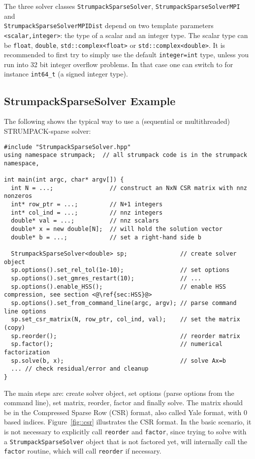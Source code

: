 \documentclass{article}
\begin{document}
The three solver classes \lstinline[style=C]!StrumpackSparseSolver!,
\lstinline[style=C]!StrumpackSparseSolverMPI! and\\
\lstinline[style=C]!StrumpackSparseSolverMPIDist! depend on two
template parameters \lstinline[style=C]!<scalar,integer>!: the type of
a scalar and an integer type. The scalar type can be
\lstinline[style=C]!float!, \lstinline[style=C]!double!,
\lstinline[style=C]!std::complex<float>! or
\lstinline[style=C]!std::complex<double>!. It is recommended to first
try to simply use the default \lstinline[style=C]!integer=int! type,
unless you run into 32 bit integer overflow problems. In that case one
can switch to for instance \lstinline[style=C]!int64_t! (a signed
integer type).

\subsection{StrumpackSparseSolver Example}
The following shows the typical way to use a (sequential or
multithreaded) STRUMPACK-sparse solver:
\begin{lstlisting}[style=C]
#include "StrumpackSparseSolver.hpp"
using namespace strumpack;  // all strumpack code is in the strumpack namespace,

int main(int argc, char* argv[]) {
  int N = ...;                // construct an NxN CSR matrix with nnz nonzeros
  int* row_ptr = ...;         // N+1 integers
  int* col_ind = ...;         // nnz integers
  double* val = ...;          // nnz scalars
  double* x = new double[N];  // will hold the solution vector
  double* b = ...;            // set a right-hand side b

  StrumpackSparseSolver<double> sp;               // create solver object
  sp.options().set_rel_tol(1e-10);                // set options
  sp.options().set_gmres_restart(10);             // ...
  sp.options().enable_HSS();                      // enable HSS compression, see section <@\ref{sec:HSS}@>
  sp.options().set_from_command_line(argc, argv); // parse command line options
  sp.set_csr_matrix(N, row_ptr, col_ind, val);    // set the matrix (copy)
  sp.reorder();                                   // reorder matrix
  sp.factor();                                    // numerical factorization
  sp.solve(b, x);                                 // solve Ax=b
  ... // check residual/error and cleanup
}
\end{lstlisting}
The main steps are: create solver object, set options (parse options
from the command line), set matrix, reorder, factor and finally
solve. The matrix should be in the Compressed Sparse Row (CSR) format,
also called Yale format, with $0$ based indices. Figure~\ref{fig::csr}
illustrates the CSR format. In the basic scenario, it is not necessary
to explicitly call \lstinline[style=C]!reorder!  and
\lstinline[style=C]!factor!, since trying to solve with a
\lstinline[style=C]!StrumpackSparseSolver! object that is not factored
yet, will internally call the \lstinline[style=C]!factor! routine,
which will call \lstinline[style=C]!reorder! if necessary.
\end{document}
